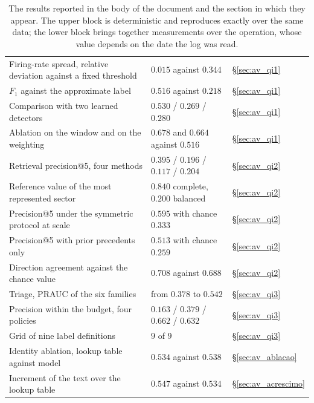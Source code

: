 \begin{table}[!htbp]
\caption[Each result and the procedure that produces it]{The results reported in the body of the
document and the section in which they appear. The upper block is deterministic and reproduces
exactly over the same data; the lower block brings together measurements over the operation, whose
value depends on the date the log was read.}
\label{tab:ap_numeros}
\centering
\small
\begin{tabular}{p{} L{0.21\textwidth} L{0.19\textwidth}}
\toprule
{} &  &  \\
\midrule
Firing-rate spread, relative deviation against a fixed threshold & $0.015$ against $0.344$ &
§\ref{sec:av_qi1} \\
$F_1$ against the approximate label & $0.516$ against $0.218$ & §\ref{sec:av_qi1} \\
Comparison with two learned detectors & $0.530$ / $0.269$ / $0.280$ & §\ref{sec:av_qi1} \\
Ablation on the window and on the weighting & $0.678$ and $0.664$ against $0.516$ &
§\ref{sec:av_qi1} \\
\addlinespace
Retrieval precision@5, four methods & $0.395$ / $0.196$ / $0.117$ / $0.204$ & §\ref{sec:av_qi2} \\
Reference value of the most represented sector & $0.840$ complete, $0.200$ balanced & §\ref{sec:av_qi2} \\
Precision@5 under the symmetric protocol at scale & $0.595$ with chance $0.333$ &
§\ref{sec:av_qi2} \\
Precision@5 with prior precedents only & $0.513$ with chance $0.259$ & §\ref{sec:av_qi2} \\
Direction agreement against the chance value & $0.708$ against $0.688$ & §\ref{sec:av_qi2} \\
\addlinespace
Triage, \gls{PRAUC} of the six families & from $0.378$ to $0.542$ & §\ref{sec:av_qi3} \\
Precision within the budget, four policies & $0.163$ / $0.379$ / $0.662$ / $0.632$ &
§\ref{sec:av_qi3} \\
Grid of nine label definitions & $9$ of $9$ & §\ref{sec:av_qi3} \\
Identity ablation, lookup table against model & $0.534$ against $0.538$ & §\ref{sec:av_ablacao} \\
Increment of the text over the lookup table & $0.547$ against $0.534$ & §\ref{sec:av_acrescimo} \\

\end{tabular}
\end{table}
